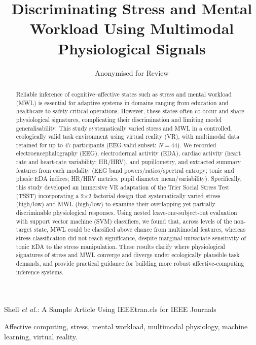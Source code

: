 \documentclass[lettersize,journal]{IEEEtran}
\begin{document}
\title{Discriminating Stress and Mental Workload Using Multimodal Physiological Signals}

\author{Anonymised for Review}

%
{Shell \MakeLowercase{\textit{et al.}}: A Sample Article Using IEEEtran.cls for IEEE Journals}

\maketitle


\begin{abstract}
Reliable inference of cognitive–affective states such as stress and mental workload (MWL) is essential for adaptive systems in domains ranging from education and healthcare to safety-critical operations. However, these states often co-occur and share physiological signatures, complicating their discrimination and limiting model generalisability. This study systematically varied stress and MWL in a controlled, ecologically valid task environment using virtual reality (VR), with multimodal data retained for up to 47 participants (EEG-valid subset: $N=44$). We recorded electroencephalography (EEG), electrodermal activity (EDA), cardiac activity (heart rate and heart-rate variability; HR/HRV), and pupillometry, and extracted summary features from each modality (EEG band powers/ratios/spectral entropy; tonic and phasic EDA indices; HR/HRV metrics; pupil diameter mean/variability). Specifically, this study developed an immersive VR adaptation of the Trier Social Stress Test (TSST) incorporating a 2×2 factorial design that systematically varied stress (high/low) and MWL (high/low) to examine their overlapping yet partially discriminable physiological responses. Using nested leave-one-subject-out evaluation with support vector machine (SVM) classifiers, we found that, across levels of the non-target state, MWL could be classified above chance from multimodal features, whereas stress classification did not reach significance, despite marginal univariate sensitivity of tonic EDA to the stress manipulation. These results clarify where physiological signatures of stress and MWL converge and diverge under ecologically plausible task demands, and provide practical guidance for building more robust affective-computing inference systems.

\end{abstract}


\begin{IEEEkeywords}
Affective computing, stress, mental workload, multimodal physiology, machine learning, virtual reality.
\end{IEEEkeywords}
\end{document}
